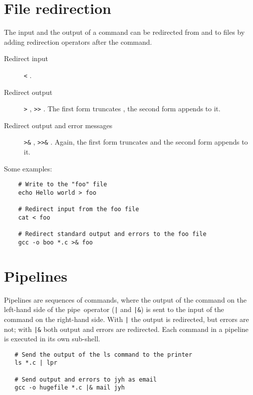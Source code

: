 \section{File redirection}

The input and the output of a command can be redirected from and to files by adding redirection
operators after the command.

\begin{description}
\item[Redirect input]  \verb+<+ .

\item[Redirect output]  \verb+>+ ,  \verb+>>+
  .  The first form truncates , the
  second form appends to it.

\item[Redirect output and error messages]  \verb+>&+ ,
   \verb+>>&+ .  Again, the first form truncates 
  and the second form appends to it.
\end{description}

Some examples:

\begin{verbatim}
    # Write to the "foo" file
    echo Hello world > foo

    # Redirect input from the foo file
    cat < foo

    # Redirect standard output and errors to the foo file
    gcc -o boo *.c >& foo
\end{verbatim}

\section{Pipelines}

Pipelines are sequences of commands, where the output of the command on the left-hand side of the
pipe~operator (\verb+|+ and \verb+|&+) is sent to the input of the command on the right-hand side.
With \verb+|+ the output is redirected, but errors are not; with \verb+|&+ both output and errors
are redirected.  Each command in a pipeline is executed in its own sub-shell.

\begin{verbatim}
   # Send the output of the ls command to the printer
   ls *.c | lpr

   # Send output and errors to jyh as email
   gcc -o hugefile *.c |& mail jyh
\end{verbatim}

